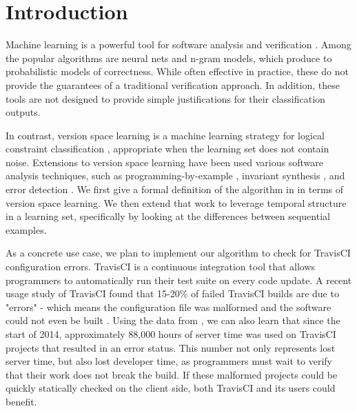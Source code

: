 \section{Introduction}

Machine learning is a powerful tool for software analysis and verification \cite{Santolucito2016,gehrpsi,garg2014ice}.
Among the popular algorithms are neural nets and n-gram models, which produce to probabilistic models of correctness.
While often effective in practice, these do not provide the guarantees of a traditional verification approach.
In addition, these tools are not designed to provide simple justifications for their classification outputs.

In contrast, version space learning is a machine learning strategy for logical constraint classification \cite{mitchell82}, appropriate when the learning set does not contain noise.
Extensions to version space learning have been used various software analysis techniques, such as programming-by-example \cite{lau2000version}, invariant synthesis \cite{garg2014ice}, and error detection \cite{Santolucito2016}.
We first give a formal definition of the algorithm in \cite{Santolucito2016} in terms of version space learning.
We then extend that work to leverage temporal structure in a learning set, specifically by looking at the differences between sequential examples.

As a concrete use case, we plan to implement our algorithm to check for TravisCI configuration errors.
TravisCI is a continuous integration tool that allows programmers to automatically run their test suite on every code update.
A recent usage study of TravisCI found that 15-20\% of failed TravisCI builds are due to "errors" - which means the configuration file was malformed and the software could not even be built \cite{API}.
Using the data from \cite{API}, we can also learn that since the start of 2014, approximately 88,000 hours of server time was used on TravisCI projects that resulted in an error status.
This number not only represents lost server time, but also lost developer time, as programmers must wait to verify that their work does not break the build.
If these malformed projects could be quickly statically checked on the client side, both TravisCI and its users could benefit.

